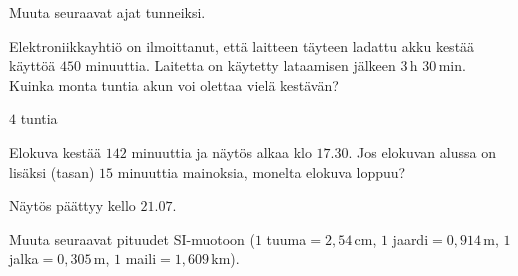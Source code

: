 \begin{tehtavasivu}
\begin{tehtava}
Muuta seuraavat ajat tunneiksi.
	\begin{vastaus}
	\end{vastaus}
\end{tehtava}

\begin{tehtava}
Elektroniikkayhtiö on ilmoittanut, että laitteen täyteen ladattu akku kestää käyttöä $450$ minuuttia. Laitetta on käytetty lataamisen jälkeen $3$\,h $30$\,min. Kuinka monta tuntia akun voi olettaa vielä kestävän?
\begin{vastaus}
$4$ tuntia
\end{vastaus}
\end{tehtava}

\begin{tehtava}
Elokuva kestää $142$ minuuttia ja näytös alkaa klo $17.30$. Jos elokuvan alussa on lisäksi (tasan) $15$ minuuttia mainoksia, monelta elokuva loppuu?
	\begin{vastaus}
	Näytös päättyy kello $21.07$.
	\end{vastaus}
\end{tehtava}



\begin{tehtava}
Muuta seuraavat pituudet SI-muotoon ($1$ tuuma$= 2,54$\,cm, $1$ jaardi$=0,914$\,m, $1$ jalka$= 0,305$\,m, $1$ maili$ = 1,609$\,km).
\begin{vastaus}
\end{vastaus}
\end{tehtava}


\end{tehtavasivu}
